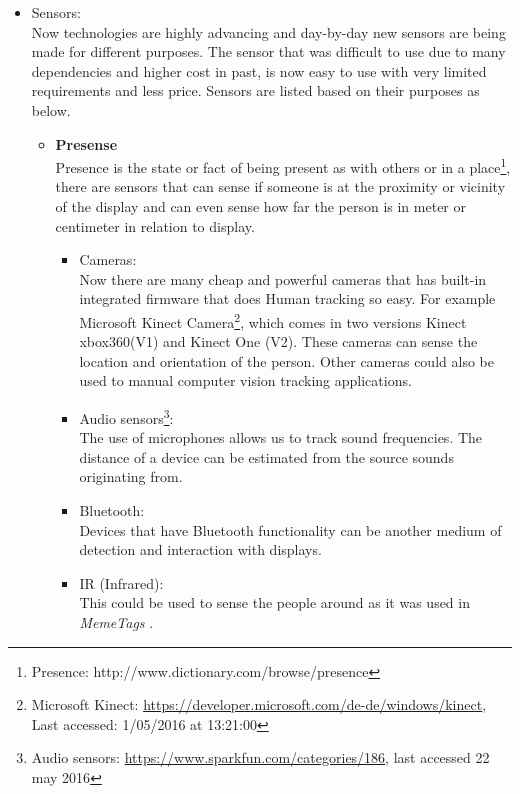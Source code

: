 \begin{itemize}
\begin{itemize}
\begin{itemize}
\end{itemize}

\end{itemize}

\item Sensors: \\
Now technologies are highly advancing and day-by-day new sensors are being made for different purposes. The sensor that was difficult to use due to many dependencies and higher cost in past, is now easy to use with very limited requirements and less price. Sensors are listed based on their purposes as below.


\begin{itemize}

\item \textbf{Presense} \\
Presence is the state or fact of being present as with others or in a place\footnote{Presence: http://www.dictionary.com/browse/presence}, there are sensors that can sense if someone is at the proximity or vicinity of the display and can even sense how far the person is in meter or centimeter in relation to display. 


\begin{itemize}
\item Cameras: \\
Now there are many cheap and powerful cameras that has built-in integrated firmware that does Human tracking so easy. For example Microsoft Kinect Camera\footnote{Microsoft Kinect: \url{https://developer.microsoft.com/de-de/windows/kinect}, Last accessed: 1/05/2016 at 13:21:00}, which comes in two versions Kinect xbox360(V1) and Kinect One (V2). These cameras can sense the location and orientation of the person. Other cameras could also be used to manual computer vision tracking applications.

\item Audio sensors\footnote{Audio sensors: \url{https://www.sparkfun.com/categories/186}, last accessed 22 may 2016}: \\
The use of microphones allows us to track sound frequencies. The distance of a device can be estimated from the source sounds originating from.

\item Bluetooth: \\
Devices that have Bluetooth functionality can be another medium of detection and interaction with displays.

\item IR (Infrared): \\
This could be used to sense the people around as it was used in \emph{MemeTags} \cite{meme-tags}.


\end{itemize}
\end{itemize}
\end{itemize}
